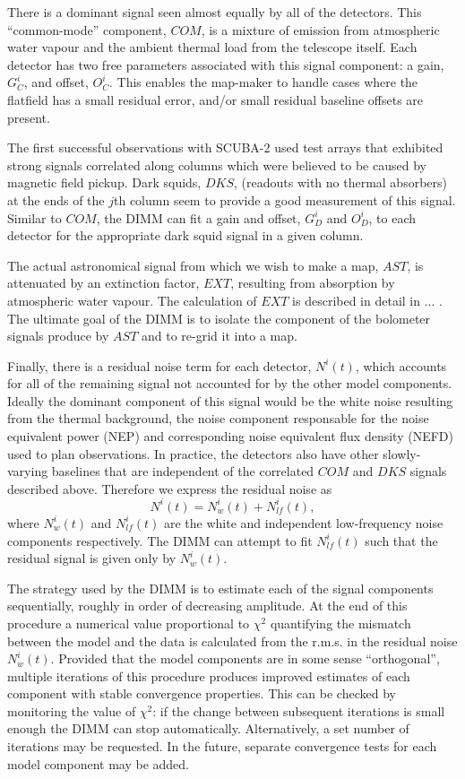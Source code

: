 \documentclass[twoside,11pt]{article}
\renewcommand{\_}{\texttt{\symbol{95}}}
\begin{document}
There is a dominant signal seen almost equally by all of the
detectors. This ``common-mode'' component, $COM$, is a mixture of
emission from atmospheric water vapour and the ambient thermal load
from the telescope itself. Each detector has two free parameters
associated with this signal component: a gain, $G_C^i$, and offset,
$O_C^i$. This enables the map-maker to handle cases where the
flatfield has a small residual error, and/or small residual baseline
offsets are present.

The first successful observations with SCUBA-2 used test arrays that
exhibited strong signals correlated along columns which were believed
to be caused by magnetic field pickup. Dark squids, $DKS$, (readouts
with no thermal absorbers) at the ends of the $j$th column seem to
provide a good measurement of this signal. Similar to $COM$, the DIMM
can fit a gain and offset, $G_D^i$ and $O_D^i$, to each detector for
the appropriate dark squid signal in a given column.

The actual astronomical signal from which we wish to make a map,
$AST$, is attenuated by an extinction factor, $EXT$, resulting from
absorption by atmospheric water vapour. The calculation of $EXT$ is
described in detail in ... . The ultimate goal of the DIMM is to
isolate the component of the bolometer signals produce by $AST$ and to
re-grid it into a map.

Finally, there is a residual noise term for each detector, $N^i(t)$,
which accounts for all of the remaining signal not accounted for by
the other model components. Ideally the dominant component of this
signal would be the white noise resulting from the thermal background,
the noise component responsable for the noise equivalent power (NEP)
and corresponding noise equivalent flux density (NEFD) used to plan
observations. In practice, the detectors also have other
slowly-varying baselines that are independent of the correlated $COM$
and $DKS$ signals described above. Therefore we express the residual
noise as
%
\begin{equation}
N^i(t) = N^i_w(t) + N^i_{lf}(t),
\label{eq:dimm_noise}
\end{equation}
%
where $N^i_w(t)$ and $N^i_{lf}(t)$ are the white and independent
low-frequency noise components respectively. The DIMM can attempt to
fit $N^i_{lf}(t)$ such that the residual signal is given only by
$N^i_w(t)$.

The strategy used by the DIMM is to estimate each of the signal
components sequentially, roughly in order of decreasing amplitude. At
the end of this procedure a numerical value proportional to $\chi^2$
quantifying the mismatch between the model and the data is calculated
from the r.m.s. in the residual noise $N^i_w(t)$. Provided that the
model components are in some sense ``orthogonal'', multiple iterations
of this procedure produces improved estimates of each component with
stable convergence properties. This can be checked by monitoring the
value of $\chi^2$: if the change between subsequent iterations is
small enough the DIMM can stop automatically. Alternatively, a set
number of iterations may be requested. In the future, separate
convergence tests for each model component may be added.
\end{document}
